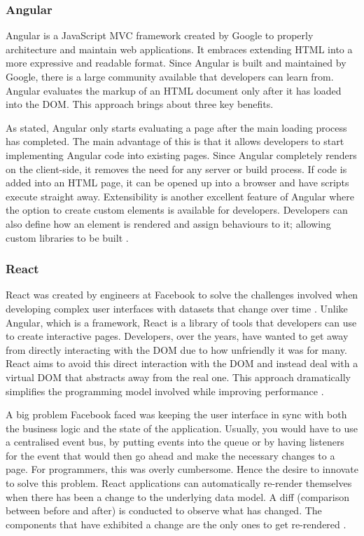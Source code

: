 \subsubsection{Angular}
Angular is a JavaScript MVC framework created by Google to properly architecture and maintain web applications.
It embraces extending HTML into a more expressive and readable format. 
Since Angular is built and maintained by Google, there is a large community available that developers can learn from.
Angular evaluates the markup of an HTML document only after it has loaded into the DOM.
This approach brings about three key benefits.

As stated, Angular only starts evaluating a page after the main loading process has completed.
The main advantage of this is that it allows developers to start implementing Angular code into existing pages.
Since Angular completely renders on the client-side, it removes the need for any server or build process. 
If code is added into an HTML page, it can be opened up into a browser and have scripts execute straight away.
Extensibility is another excellent feature of Angular where the option to create custom elements is available for developers.
Developers can also define how an element is rendered and assign behaviours to it; allowing custom libraries to be built \cite{jain2015angularjs}.

\subsubsection{React} 
React was created by engineers at Facebook to solve the challenges involved when developing complex user interfaces with datasets that change over time \cite{gackenheimer2015introduction}. 
Unlike Angular, which is a framework, React is a library of tools that developers can use to create interactive pages.
Developers, over the years, have wanted to get away from directly interacting with the DOM due to how unfriendly it was for many.
React aims to avoid this direct interaction with the DOM and instead deal with a virtual DOM that abstracts away from
the real one. This approach dramatically simplifies the programming model involved while improving performance \cite{staff2016react}.

A big problem Facebook faced was keeping the user interface in sync with both the business logic and the state of the application.
Usually, you would have to use a centralised event bus, by putting events into the queue or by having listeners for the event that would then go
ahead and make the necessary changes to a page. 
For programmers, this was overly cumbersome. Hence the desire to innovate to solve this problem.
React applications can automatically re-render themselves when there has been a change to the underlying data model.
A diff (comparison between before and after) is conducted to observe what has changed. The components that have exhibited a change are the
only ones to get re-rendered \cite{staff2016react}.
 
